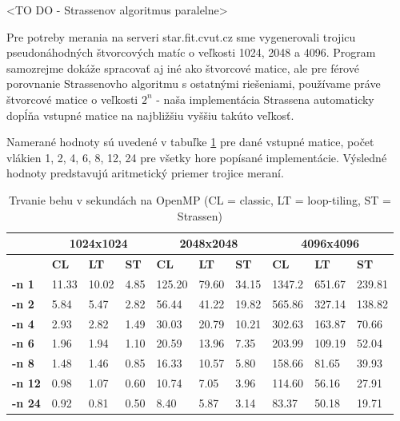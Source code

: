 \documentclass[slovak]{article}
\begin{document}
<TO DO - Strassenov algoritmus paralelne>

Pre potreby merania na serveri star.fit.cvut.cz sme vygenerovali trojicu pseudonáhodných štvorcových matíc o veľkosti 1024, 2048 a 4096. Program samozrejme dokáže spracovať aj iné ako štvorcové matice, ale pre férové porovnanie Strassenovho algoritmu s ostatnými riešeniami, používame práve štvorcové matice o veľkosti  $2^n$ - naša implementácia Strassena automaticky dopĺňa vstupné matice na najbližšiu vyššiu takúto veľkosť.

Namerané hodnoty sú uvedené v tabuľke \ref{tab1} pre dané vstupné matice, počet vlákien 1, 2, 4, 6, 8, 12, 24 pre všetky hore popísané implementácie. Výsledné hodnoty predstavujú aritmetický priemer trojice meraní.

	\begin{table}\centering
		\begin{tabularx}{\textwidth}{|X|X|X|X|X|X|X|X|X|X|}
			\hline                        
			& \multicolumn{3}{|c|}{\textbf{1024x1024}} & \multicolumn{3}{|c|}{\textbf{2048x2048}} & \multicolumn{3}{|c|}{\textbf{4096x4096}} \\ \hline
			& \textbf{CL} & \textbf{LT} & \textbf{ST} & \textbf{CL} & \textbf{LT} & \textbf{ST} & \textbf{CL} & \textbf{LT} & \textbf{ST} \\ \hline
			\textbf{-n 1} & 11.33	& 10.02 & 4.85  & 125.20 & 79.60 & 34.15 & 1347.2 & 651.67 & 239.81\\ \hline
			\textbf{-n 2} & 5.84	& 5.47 &  2.82  & 56.44 & 41.22 & 19.82  & 565.86 & 327.14 & 138.82\\ \hline
			\textbf{-n 4} & 2.93	& 2.82 &  1.49  & 30.03 & 20.79 & 10.21  & 302.63 & 163.87 & 70.66\\ \hline
			\textbf{-n 6} & 1.96	& 1.94 &  1.10  & 20.59 & 13.96 & 7.35   & 203.99 & 109.19 & 52.04\\ \hline
			\textbf{-n 8} & 1.48	& 1.46 &  0.85  & 16.33 & 10.57 & 5.80   & 158.66 & 81.65 & 39.93\\ \hline
			\textbf{-n 12} & 0.98	& 1.07 &  0.60  & 10.74 & 7.05 & 3.96    & 114.60 & 56.16 & 27.91\\ \hline
			\textbf{-n 24} & 0.92	& 0.81 &  0.50  & 8.40 & 5.87 & 3.14     & 83.37 & 50.18 & 19.71\\ \hline
		\end{tabularx}
	\caption{Trvanie behu v sekundách na OpenMP (CL = classic, LT = loop-tiling, ST = Strassen)}
	\label{tab1}
	\end{table}
\end{document}
